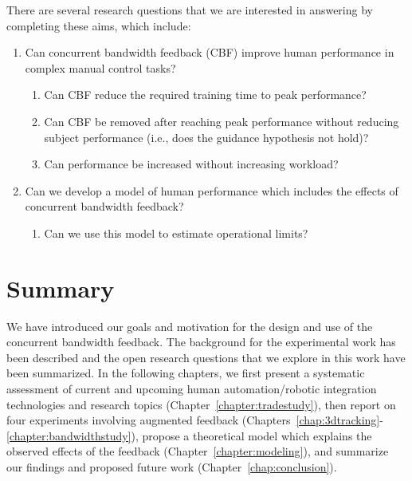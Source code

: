There are several research questions that we are interested in answering by completing these aims, which include:
\begin{enumerate}
    \item Can concurrent bandwidth feedback (CBF) improve human performance in complex manual control tasks?
          \begin{enumerate}
              \item Can CBF reduce the required training time to peak performance?
              \item Can CBF be removed after reaching peak performance without reducing subject performance (i.e., does the guidance hypothesis not hold)?
              \item Can performance be increased without increasing workload?
          \end{enumerate}
    \item Can we develop a model of human performance which includes the effects of concurrent bandwidth feedback?
          \begin{enumerate}
              \item Can we use this model to estimate operational limits?
          \end{enumerate}
\end{enumerate}

\section{Summary}
We have introduced our goals and motivation for the design and use of the concurrent bandwidth feedback.
The background for the experimental work has been described and the open research questions that we explore in this work have been summarized.
In the following chapters, we first present a systematic assessment of current and upcoming human automation/robotic integration technologies and research topics (Chapter~\ref{chapter:tradestudy}), then report on four experiments involving augmented feedback (Chapters~\ref{chap:3dtracking}-\ref{chapter:bandwidthstudy}), propose a theoretical model which explains the observed effects of the feedback (Chapter~\ref{chapter:modeling}), and summarize our findings and proposed future work (Chapter~\ref{chap:conclusion}).
